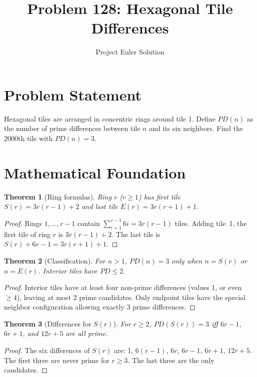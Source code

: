 \documentclass[11pt,a4paper]{article}
\title{Problem 128: Hexagonal Tile Differences}
\author{Project Euler Solution}
\date{}
\newtheorem{theorem}{Theorem}
\begin{document}
\maketitle

\section{Problem Statement}

Hexagonal tiles are arranged in concentric rings around tile 1. Define $PD(n)$ as the number of prime differences between tile $n$ and its six neighbors. Find the 2000th tile with $PD(n) = 3$.

\section{Mathematical Foundation}

\begin{theorem}[Ring formulas]
Ring $r$ ($r \ge 1$) has first tile $S(r) = 3r(r-1) + 2$ and last tile $E(r) = 3r(r+1) + 1$.
\end{theorem}

\begin{proof}
Rings $1, \ldots, r-1$ contain $\sum_{i=1}^{r-1} 6i = 3r(r-1)$ tiles. Adding tile~1, the first tile of ring $r$ is $3r(r-1) + 2$. The last tile is $S(r) + 6r - 1 = 3r(r+1) + 1$.
\end{proof}

\begin{theorem}[Classification]
For $n > 1$, $PD(n) = 3$ only when $n = S(r)$ or $n = E(r)$. Interior tiles have $PD \le 2$.
\end{theorem}

\begin{proof}
Interior tiles have at least four non-prime differences (values 1, or even $\ge 4$), leaving at most 2 prime candidates. Only endpoint tiles have the special neighbor configuration allowing exactly 3 prime differences.
\end{proof}

\begin{theorem}[Differences for $S(r)$]
For $r \ge 2$, $PD(S(r)) = 3$ iff $6r-1$, $6r+1$, and $12r+5$ are all prime.
\end{theorem}

\begin{proof}
The six differences of $S(r)$ are: 1, $6(r-1)$, $6r$, $6r-1$, $6r+1$, $12r+5$. The first three are never prime for $r \ge 3$. The last three are the only candidates.
\end{proof}
\end{document}
